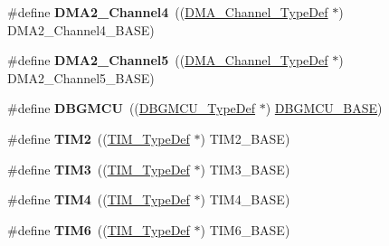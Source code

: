 \begin{DoxyCompactItemize}
\item 
\hypertarget{group___peripheral__declaration_ga612b396657695191ad740b0b59bc9f12}{\#define {\bfseries D\-M\-A2\-\_\-\-Channel4}~((\hyperlink{struct_d_m_a___channel___type_def}{D\-M\-A\-\_\-\-Channel\-\_\-\-Type\-Def} $\ast$) D\-M\-A2\-\_\-\-Channel4\-\_\-\-B\-A\-S\-E)}\label{group___peripheral__declaration_ga612b396657695191ad740b0b59bc9f12}

\item 
\hypertarget{group___peripheral__declaration_ga521c13b7d0f82a6897d47995da392750}{\#define {\bfseries D\-M\-A2\-\_\-\-Channel5}~((\hyperlink{struct_d_m_a___channel___type_def}{D\-M\-A\-\_\-\-Channel\-\_\-\-Type\-Def} $\ast$) D\-M\-A2\-\_\-\-Channel5\-\_\-\-B\-A\-S\-E)}\label{group___peripheral__declaration_ga521c13b7d0f82a6897d47995da392750}

\item 
\hypertarget{group___peripheral__declaration_ga92ec6d9ec2251fda7d4ce09748cd74b4}{\#define {\bfseries D\-B\-G\-M\-C\-U}~((\hyperlink{struct_d_b_g_m_c_u___type_def}{D\-B\-G\-M\-C\-U\-\_\-\-Type\-Def} $\ast$) \hyperlink{group___peripheral__memory__map_ga4adaf4fd82ccc3a538f1f27a70cdbbef}{D\-B\-G\-M\-C\-U\-\_\-\-B\-A\-S\-E})}\label{group___peripheral__declaration_ga92ec6d9ec2251fda7d4ce09748cd74b4}

\item 
\hypertarget{group___peripheral__declaration_ga3cfac9f2e43673f790f8668d48b4b92b}{\#define {\bfseries T\-I\-M2}~((\hyperlink{struct_t_i_m___type_def}{T\-I\-M\-\_\-\-Type\-Def} $\ast$) T\-I\-M2\-\_\-\-B\-A\-S\-E)}\label{group___peripheral__declaration_ga3cfac9f2e43673f790f8668d48b4b92b}

\item 
\hypertarget{group___peripheral__declaration_ga61ee4c391385607d7af432b63905fcc9}{\#define {\bfseries T\-I\-M3}~((\hyperlink{struct_t_i_m___type_def}{T\-I\-M\-\_\-\-Type\-Def} $\ast$) T\-I\-M3\-\_\-\-B\-A\-S\-E)}\label{group___peripheral__declaration_ga61ee4c391385607d7af432b63905fcc9}

\item 
\hypertarget{group___peripheral__declaration_ga91a09bad8bdc7a1cb3d85cf49c94c8ec}{\#define {\bfseries T\-I\-M4}~((\hyperlink{struct_t_i_m___type_def}{T\-I\-M\-\_\-\-Type\-Def} $\ast$) T\-I\-M4\-\_\-\-B\-A\-S\-E)}\label{group___peripheral__declaration_ga91a09bad8bdc7a1cb3d85cf49c94c8ec}

\item 
\hypertarget{group___peripheral__declaration_gac7b4ed55f9201b498b38c962cca97314}{\#define {\bfseries T\-I\-M6}~((\hyperlink{struct_t_i_m___type_def}{T\-I\-M\-\_\-\-Type\-Def} $\ast$) T\-I\-M6\-\_\-\-B\-A\-S\-E)}\label{group___peripheral__declaration_gac7b4ed55f9201b498b38c962cca97314}


\end{DoxyCompactItemize}
